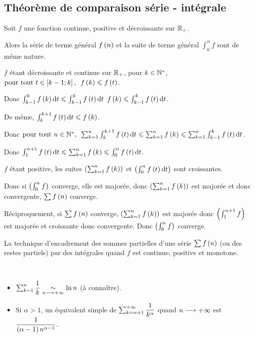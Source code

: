 \subsection{Théorème de comparaison série - intégrale}

\begin{prop}
Soit \(f\) une fonction continue, positive et décroissante sur \(\mathbb{R}_+\).

Alors la série de terme général \(f\left(n\right)\) et la suite de terme général \(\int_0^nf\) sont de même nature.
\end{prop}

\begin{dem}
\(f\) étant décroissante et continue sur \(\mathbb{R}_+\), pour \(k\in\mathbb{N}^*\), \(\quantifs{\tpt t\in\intervii{k-1}{k}}f\paren{k}\leq f\paren{t}\).

Donc \(\int_{k-1}^kf\paren{k}\odif{t}\leq\int_{k-1}^kf\paren{t}\odif{t}\) \ie \(f\paren{k}\leq\int_{k-1}^kf\paren{t}\odif{t}\).

De même, \(\int_k^{k+1}f\paren{t}\odif{t}\leq f\paren{k}\).

Donc \(\quantifs{\tpt n\in\Ns}\sum_{k=1}^n\int_k^{k+1}f\paren{t}\odif{t}\leq\sum_{k=1}^nf\paren{k}\leq\sum_{k=1}^n\int_{k-1}^kf\paren{t}\odif{t}\).

Donc \(\int_1^{n+1}f\paren{t}\odif{t}\leq\sum_{k=1}^nf\paren{k}\leq\int_0^nf\paren{t}\odif{t}\).

\(f\) étant positive, les suites \(\left(\sum_{k=1}^nf\left(k\right)\right)\) et \(\paren{\int_0^nf\paren{t}\odif{t}}\) sont croissantes.

Donc si \(\left(\int_0^nf\right)\) converge, elle est majorée, donc \(\left(\sum_{k=1}^nf\left(k\right)\right)\) est majorée et donc convergente, \ie \(\sum f\left(n\right)\) converge.

Réciproquement, si \(\sum f\left(n\right)\) converge, \(\left(\sum_{k=1}^nf\left(k\right)\right)\) est majorée donc \(\left(\int_1^{n+1}f\right)\) est majorée et croissante donc convergente. Donc \(\left(\int_0^nf\right)\) converge.
\end{dem}

\begin{meth}[À retenir]
La technique d'encadrement des sommes partielles d'une série \(\sum f\left(n\right)\) (ou des restes partiels) par des intégrales quand \(f\) est continue, positive et monotone.
\end{meth}

\begin{ex}~\\
\begin{itemize}
    \item \(\sum_{k=1}^n\dfrac{1}{k}\underset{n\longrightarrow+\infty}{\sim}\ln n\) (à connaître). \\
    \item Si \(\alpha>1\), un équivalent simple de \(\sum_{k=n+1}^{+\infty}\dfrac{1}{k^\alpha}\) quand \(n\longrightarrow+\infty\) est \(\dfrac{1}{\left(\alpha-1\right)n^{\alpha-1}}\).
\end{itemize}
\end{ex}

